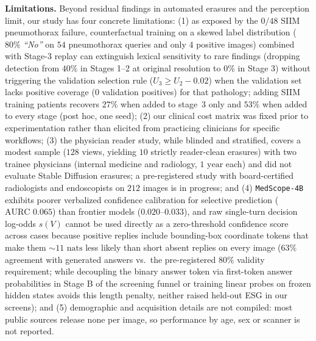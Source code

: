\documentclass[5p,times,twocolumn,authoryear]{elsarticle}
\begin{document}
\textbf{Limitations.} Beyond residual findings in automated erasures and the perception limit, our study has four concrete limitations: (1) as exposed by the $0/48$ SIIM pneumothorax failure, counterfactual training on a skewed label distribution ($80\%$ \emph{``No''} on $54$ pneumothorax queries and only $4$ positive images) combined with Stage-3 replay can extinguish lexical sensitivity to rare findings (dropping detection from $40\%$ in Stages 1--2 at original resolution to $0\%$ in Stage 3) without triggering the validation selection rule ($U_3 \ge U_2 - 0.02$) when the validation set lacks positive coverage ($0$ validation positives) for that pathology; adding SIIM training patients recovers $27\%$ when added to stage~3 only and $53\%$ when added to every stage (post hoc, one seed); (2) our clinical cost matrix was fixed prior to experimentation rather than elicited from practicing clinicians for specific workflows; (3) the physician reader study, while blinded and stratified, covers a modest sample ($128$ views, yielding $10$ strictly reader-clean erasures) with two trainee physicians (internal medicine and radiology, $1\text{ year}$ each) and did not evaluate Stable Diffusion erasures; a pre-registered study with board-certified radiologists and endoscopists on $212$ images is in progress; and (4) \texttt{MedScope-4B} exhibits poorer verbalized confidence calibration for selective prediction ($\text{AURC } 0.065$) than frontier models ($0.020\text{--}0.033$), and raw single-turn decision log-odds $s(V)$ cannot be used directly as a zero-threshold confidence score across cases because positive replies include bounding-box coordinate tokens that make them $\sim 11\text{ nats}$ less likely than short absent replies on every image ($63\%$ agreement with generated answers vs.\ the pre-registered $80\%$ validity requirement; while decoupling the binary answer token via first-token answer probabilities in Stage B of the screening funnel or training linear probes on frozen hidden states avoids this length penalty, neither raised held-out ESG in our screens); and (5) demographic and acquisition details are not compiled: most public sources release none per image, so performance by age, sex or scanner is not reported.
\end{document}

